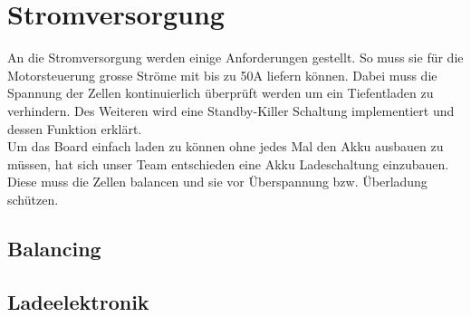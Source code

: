 \section{Stromversorgung}
\label{HW_Stromversorgung}
An die Stromversorgung werden einige Anforderungen gestellt. So muss sie für die Motorsteuerung grosse Ströme mit bis zu 50A liefern können. Dabei muss die Spannung der Zellen kontinuierlich überprüft werden um ein Tiefentladen zu verhindern. Des Weiteren wird eine Standby-Killer Schaltung implementiert und dessen Funktion erklärt.\\
Um das Board einfach laden zu können ohne jedes Mal den Akku ausbauen zu müssen, hat sich unser Team entschieden eine Akku Ladeschaltung einzubauen. Diese muss die Zellen balancen und sie vor Überspannung bzw. Überladung schützen. 
\subsection*{Balancing}


\subsection*{Ladeelektronik}


